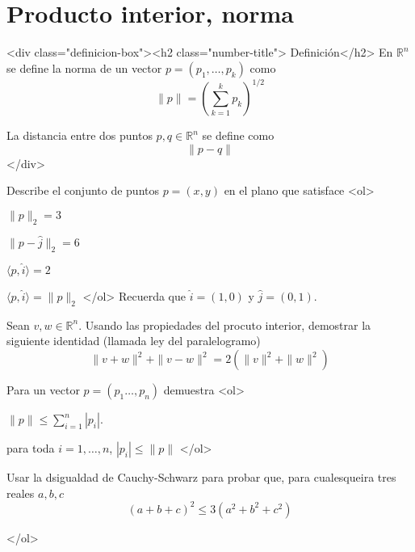 \documentclass{article}
\theoremstyle{definition}
\begin{document}
       
       
       \section{Producto interior, norma}


	<div class="definicion-box"><h2 class="number-title">  Definición</h2>
	En $\mathbb{R}^n$ se define la norma de un vector $p=(p_1,\dots, p_k)$ como
	$$
		\|p\|=\left( \sum_{k=1}^k p_k\right)^{1/2}
	$$
	
	La distancia entre dos puntos $p,q \in \mathbb{R}^n$ se define como
	$$
	\|p-q\|	
	$$
	</div>
       
       \item Describe el conjunto de puntos $p=(x,y)$ en el  plano que satisface
         <ol>
         \item $\|p\|_2=3$
         \item $\|p-\hat{j}\|_2=6$
         \item $ \langle p, \hat{i} \rangle=2$
         \item $\langle p, \hat{i} \rangle = \|p\|_2$
         </ol>
         Recuerda que $\hat{i}=(1,0)$ y $\hat{j}=(0,1)$.



       \item Sean $v, w\in \mathbb{R}^n$.
       	Usando las propiedades del procuto interior, demostrar la siguiente identidad (llamada ley del paralelogramo)
         $$
         \|v+w\|^2+\|v-w\|^2=2(\|v\|^2+\|w\|^2)
         $$


        
			\item Para un vector $p=(p_1\dots, p_n) $ demuestra
			<ol>
			\item $	\|p\| \leq \sum_{i=1}^n|p_i| $. 
			\item para toda $i=1,\dots, n$, $|p_i| \leq \|p\|$
			</ol>
                
       \item Usar la dsigualdad de Cauchy-Schwarz para probar que, para cualesqueira tres
         reales $a,b,c$
         $$
         (a+b+c)^2 \leq 3(a^2+b^2+c^2)
         $$
         

       </ol>


  
       
\end{document}
